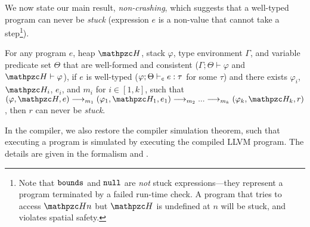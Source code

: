 We now state our main result, {\em non-crashing},
which suggests that a well-typed program can never be \emph{stuck} (expression
$e$ is a non-value that cannot take a step\footnote{Note that
  $\mathtt{bounds}$ and $\mathtt{null}$ are \emph{not} stuck expressions---they represent a
  program terminated by a failed run-time check. A program that tries to access $\heap{n}$
  but $\heap$ is undefined at $n$ will be stuck, and violates spatial
  safety.}).


\begin{thm}\label{thm:blame} For any \lang
  program $e$, heap $\heap$, stack
$\varphi$, type environment $\Gamma$, and variable predicate set $\Theta$
that are well-formed and consistent
($\Gamma;\Theta\vdash \varphi$ and $\heap \vdash \varphi$),
if $e$ is well-typed ($\varphi;\Theta\vdash_{\texttt{c}} e :
\tau$ for some $\tau$) and there exists
$\varphi_i$, $\heap_i$, $e_i$, and $m_i$ for $i\in [1,k]$, such that
$(\varphi,\heap,e) \longrightarrow_{m_1} (\varphi_1,\heap_1,e_1)\longrightarrow_{m_2} ...\longrightarrow_{m_k} (\varphi_k,\heap_k,r)$, then $r$ can never be \emph{stuck}.
\end{thm}


In the \systemname compiler, we also restore the compiler simulation theorem, such that executing a \systemname program is simulated by executing the compiled LLVM program. The details are given in the \checkedc formalism \cite{li22checkedc} and . 


